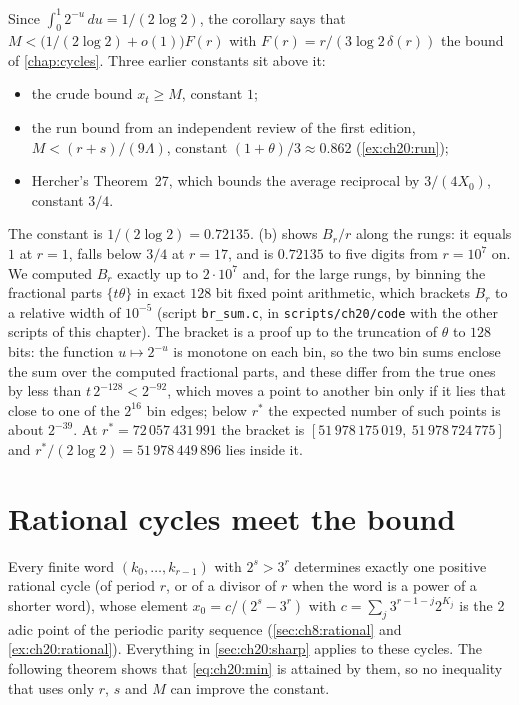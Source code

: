 Since $\int_0^1 2^{-u}\,du=1/(2\log 2)$, the corollary says that $M<\bigl(1/(2\log2)+o(1)\bigr)F(r)$ with $F(r)=r/(3\log 2\,\delta(r))$ the bound of \cref{chap:cycles}. Three earlier constants sit above it:
\begin{itemize}
\item the crude bound $x_t\ge M$, constant $1$;
\item the run bound from an independent review of the first edition, $M<(r+s)/(9\Lambda)$, constant $(1+\theta)/3\approx0.862$ (\cref{ex:ch20:run});
\item Hercher's Theorem~27, which bounds the average reciprocal by $3/(4X_0)$, constant $3/4$.
\end{itemize}
The constant is $1/(2\log2)=0.72135$. (b) shows $B_r/r$ along the rungs: it equals $1$ at $r=1$, falls below $3/4$ at $r=17$, and is $0.72135$ to five digits from $r=10^7$ on. We computed $B_r$ exactly up to $2\cdot10^7$ and, for the large rungs, by binning the fractional parts $\{t\theta\}$ in exact $128$ bit fixed point arithmetic, which brackets $B_{r}$ to a relative width of $10^{-5}$ (script \texttt{br\_sum.c}, in \texttt{scripts/ch20/code} with the other scripts of this chapter). The bracket is a proof up to the truncation of $\theta$ to $128$ bits: the function $u\mapsto2^{-u}$ is monotone on each bin, so the two bin sums enclose the sum over the computed fractional parts, and these differ from the true ones by less than $t\,2^{-128}<2^{-92}$, which moves a point to another bin only if it lies that close to one of the $2^{16}$ bin edges; below $r^\ast$ the expected number of such points is about $2^{-39}$. At $r^\ast=72\,057\,431\,991$ the bracket is $[51\,978\,175\,019,\ 51\,978\,724\,775]$ and $r^\ast/(2\log2)=51\,978\,449\,896$ lies inside it.

\section{Rational cycles meet the bound}\label{sec:ch20:ratl}

Every finite word $(k_0,\dots,k_{r-1})$ with $2^s>3^r$ determines exactly one positive rational cycle (of period $r$, or of a divisor of $r$ when the word is a power of a shorter word), whose element $x_0=c/(2^s-3^r)$ with $c=\sum_j3^{r-1-j}2^{K_j}$ is the 2 adic point of the periodic parity sequence (\cref{sec:ch8:rational} and \cref{ex:ch20:rational}). Everything in \cref{sec:ch20:sharp} applies to these cycles. The following theorem shows that \eqref{eq:ch20:min} is attained by them, so no inequality that uses only $r$, $s$ and $M$ can improve the constant.

